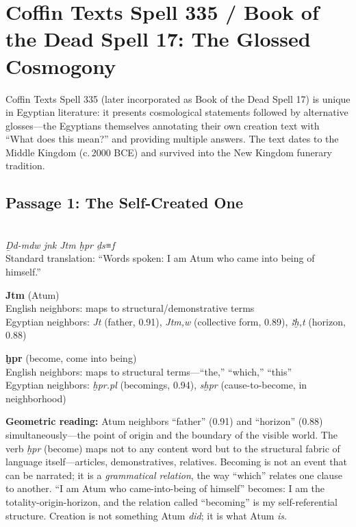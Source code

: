 \documentclass[11pt, a4paper]{article}
\newcommand{\passagehiero}[1]{{\normalfont\hierofont\fontsize{14}{17}\selectfont #1}}
\begin{document}
\section{Coffin Texts Spell 335 / Book of the Dead Spell 17: The Glossed Cosmogony}
\label{sec:ct335}

Coffin Texts Spell 335 (later incorporated as Book of the Dead Spell 17) is unique in Egyptian literature: it presents cosmological statements followed by alternative glosses---the Egyptians themselves annotating their own creation text with ``What does this mean?'' and providing multiple answers. The text dates to the Middle Kingdom (c.\,2000 BCE) and survived into the New Kingdom funerary tradition.

\subsection{Passage 1: The Self-Created One}

{\color{passage}\passagehiero{𓆓𓌃 𓇋𓈖𓎡 𓇋𓏏𓅓𓁛 𓆣𓂋 𓆓𓋴𓆑}\\\medskip
\textit{\small Ḏd-mdw jnk Jtm ḫpr ḏs≡f}\\
Standard translation: ``Words spoken: I am Atum who came into being of himself.''}

\bigskip

\noindent\textbf{Jtm} (Atum)\\
English neighbors: maps to structural/demonstrative terms\\
Egyptian neighbors: \textit{Jt} (father, 0.91), \textit{Jtm,w} (collective form, 0.89), \textit{ꜣḫ,t} (horizon, 0.88)

\medskip

\noindent\textbf{ḫpr} (become, come into being)\\
English neighbors: maps to structural terms---``the,'' ``which,'' ``this''\\
Egyptian neighbors: \textit{ḫpr.pl} (becomings, 0.94), \textit{sḫpr} (cause-to-become, in neighborhood)

\medskip

{\color{insight}\textbf{Geometric reading:}} Atum neighbors ``father'' (0.91) and ``horizon'' (0.88) simultaneously---the point of origin and the boundary of the visible world. The verb \textit{ḫpr} (become) maps not to any content word but to the structural fabric of language itself---articles, demonstratives, relatives. Becoming is not an event that can be narrated; it is a \textit{grammatical relation}, the way ``which'' relates one clause to another. ``I am Atum who came-into-being of himself'' becomes: I am the totality-origin-horizon, and the relation called ``becoming'' is my self-referential structure. Creation is not something Atum \textit{did}; it is what Atum \textit{is}.
\end{document}
